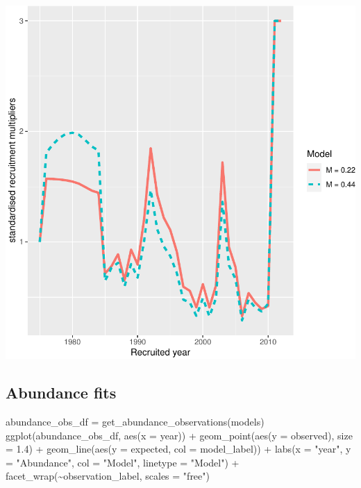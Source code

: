 \documentclass[
]{book}
\newenvironment{Shaded}{\begin{snugshade}}{\end{snugshade}}
\newcommand{\AttributeTok}[1]{\textcolor[rgb]{0.77,0.63,0.00}{#1}}
\newcommand{\FloatTok}[1]{\textcolor[rgb]{0.00,0.00,0.81}{#1}}
\newcommand{\FunctionTok}[1]{\textcolor[rgb]{0.00,0.00,0.00}{#1}}
\newcommand{\NormalTok}[1]{#1}
\newcommand{\OtherTok}[1]{\textcolor[rgb]{0.56,0.35,0.01}{#1}}
\newcommand{\SpecialCharTok}[1]{\textcolor[rgb]{0.00,0.00,0.00}{#1}}
\newcommand{\StringTok}[1]{\textcolor[rgb]{0.31,0.60,0.02}{#1}}
\begin{document}
\includegraphics{_main_files/figure-latex/compare_recruit-1.pdf}

\hypertarget{abundance-fits}{%
\subsection{Abundance fits}\label{abundance-fits}}

\begin{Shaded}
\begin{Highlighting}[]
\NormalTok{abundance\_obs\_df }\OtherTok{=} \FunctionTok{get\_abundance\_observations}\NormalTok{(models)}
\FunctionTok{ggplot}\NormalTok{(abundance\_obs\_df, }\FunctionTok{aes}\NormalTok{(}\AttributeTok{x =}\NormalTok{ year)) }\SpecialCharTok{+}
  \FunctionTok{geom\_point}\NormalTok{(}\FunctionTok{aes}\NormalTok{(}\AttributeTok{y =}\NormalTok{ observed), }\AttributeTok{size =} \FloatTok{1.4}\NormalTok{) }\SpecialCharTok{+}
  \FunctionTok{geom\_line}\NormalTok{(}\FunctionTok{aes}\NormalTok{(}\AttributeTok{y =}\NormalTok{ expected, }\AttributeTok{col =}\NormalTok{ model\_label)) }\SpecialCharTok{+}
  \FunctionTok{labs}\NormalTok{(}\AttributeTok{x =} \StringTok{"year"}\NormalTok{, }\AttributeTok{y =} \StringTok{"Abundance"}\NormalTok{, }\AttributeTok{col =} \StringTok{"Model"}\NormalTok{, }\AttributeTok{linetype =} \StringTok{"Model"}\NormalTok{) }\SpecialCharTok{+}
  \FunctionTok{facet\_wrap}\NormalTok{(}\SpecialCharTok{\textasciitilde{}}\NormalTok{observation\_label, }\AttributeTok{scales =} \StringTok{"free"}\NormalTok{)}
\end{Highlighting}
\end{Shaded}
\end{document}
